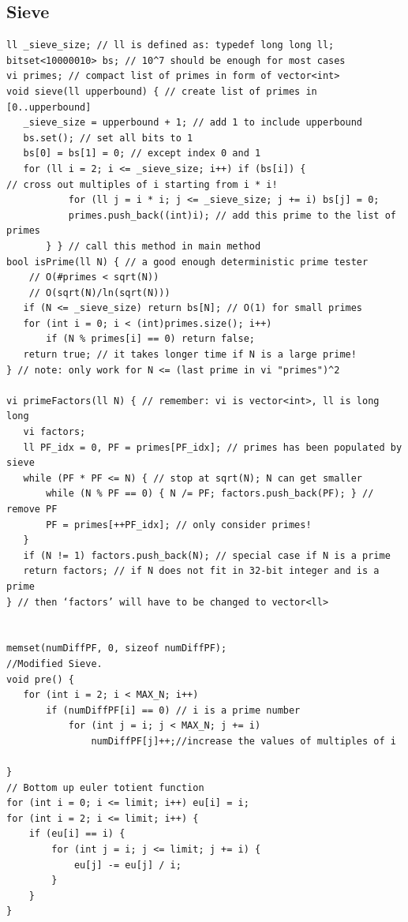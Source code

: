 \documentclass[8pt, a4paper, oneside, twocolumn]{extarticle}
\begin{document}
\subsection{Sieve}
\begin{verbatim}
ll _sieve_size; // ll is defined as: typedef long long ll;
bitset<10000010> bs; // 10^7 should be enough for most cases
vi primes; // compact list of primes in form of vector<int>
void sieve(ll upperbound) { // create list of primes in [0..upperbound]
   _sieve_size = upperbound + 1; // add 1 to include upperbound
   bs.set(); // set all bits to 1
   bs[0] = bs[1] = 0; // except index 0 and 1
   for (ll i = 2; i <= _sieve_size; i++) if (bs[i]) {
// cross out multiples of i starting from i * i!
           for (ll j = i * i; j <= _sieve_size; j += i) bs[j] = 0;
           primes.push_back((int)i); // add this prime to the list of primes
       } } // call this method in main method
bool isPrime(ll N) { // a good enough deterministic prime tester
    // O(#primes < sqrt(N))
    // O(sqrt(N)/ln(sqrt(N)))
   if (N <= _sieve_size) return bs[N]; // O(1) for small primes
   for (int i = 0; i < (int)primes.size(); i++)
       if (N % primes[i] == 0) return false;
   return true; // it takes longer time if N is a large prime!
} // note: only work for N <= (last prime in vi "primes")^2

vi primeFactors(ll N) { // remember: vi is vector<int>, ll is long long
   vi factors;
   ll PF_idx = 0, PF = primes[PF_idx]; // primes has been populated by sieve
   while (PF * PF <= N) { // stop at sqrt(N); N can get smaller
       while (N % PF == 0) { N /= PF; factors.push_back(PF); } // remove PF
       PF = primes[++PF_idx]; // only consider primes!
   }
   if (N != 1) factors.push_back(N); // special case if N is a prime
   return factors; // if N does not fit in 32-bit integer and is a prime
} // then ‘factors’ will have to be changed to vector<ll>


memset(numDiffPF, 0, sizeof numDiffPF);
//Modified Sieve.
void pre() {
   for (int i = 2; i < MAX_N; i++)
       if (numDiffPF[i] == 0) // i is a prime number
           for (int j = i; j < MAX_N; j += i)
               numDiffPF[j]++;//increase the values of multiples of i

}
// Bottom up euler totient function
for (int i = 0; i <= limit; i++) eu[i] = i;
for (int i = 2; i <= limit; i++) {
    if (eu[i] == i) {
        for (int j = i; j <= limit; j += i) {
            eu[j] -= eu[j] / i;
        }
    }
}
\end{verbatim}
\end{document}
